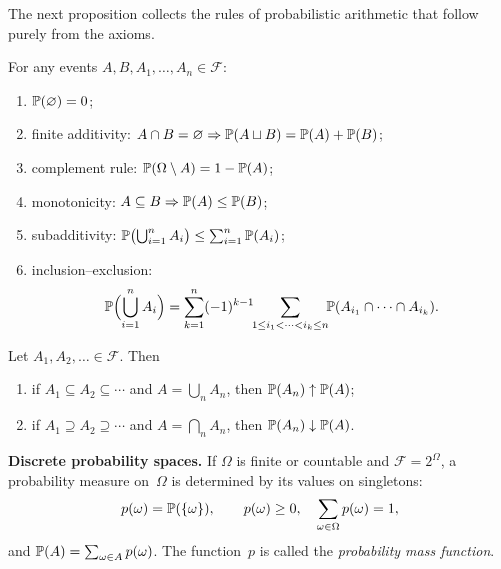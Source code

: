 The next proposition collects the rules of probabilistic arithmetic
that follow purely from the axioms.

\begin{proposition}
\label{prop:prob-elementary}
For any events $A, B, A_1, \dots, A_n \in \mathcal{F}$:
\begin{enumerate}[label=(\alph*)]
  \item $\mathbb{P}(\varnothing) = 0$;
  \item finite additivity: $A \cap B = \varnothing \Rightarrow \mathbb{P}(A \sqcup B) = \mathbb{P}(A) + \mathbb{P}(B)$;
  \item complement rule: $\mathbb{P}(\Omega \setminus A) = 1 - \mathbb{P}(A)$;
  \item monotonicity: $A \subseteq B \Rightarrow \mathbb{P}(A) \leq \mathbb{P}(B)$;
  \item subadditivity: $\mathbb{P}\bigl(\bigcup_{i=1}^{n} A_i\bigr) \leq \sum_{i=1}^{n} \mathbb{P}(A_i)$;
  \item inclusion–exclusion:
        \[
          \mathbb{P}\Bigl(\bigcup_{i=1}^{n} A_i\Bigr) = \sum_{k=1}^{n} (-1)^{k-1} \!\!\sum_{1 \leq i_1 < \cdots < i_k \leq n}\!\! \mathbb{P}(A_{i_1} \cap \cdots \cap A_{i_k}).
        \]
\end{enumerate}
\end{proposition}

\begin{theorem}
\label{thm:prob-continuity}
Let $A_1, A_2, \dots \in \mathcal{F}$. Then
\begin{enumerate}[label=(\alph*)]
  \item if $A_1 \subseteq A_2 \subseteq \cdots$ and
        $A = \bigcup_{n} A_n$, then $\mathbb{P}(A_n) \uparrow \mathbb{P}(A)$;
  \item if $A_1 \supseteq A_2 \supseteq \cdots$ and
        $A = \bigcap_{n} A_n$, then $\mathbb{P}(A_n) \downarrow \mathbb{P}(A)$.
\end{enumerate}
\end{theorem}

\medskip
\noindent\textbf{Discrete probability spaces.} If $\Omega$ is finite or
countable and $\mathcal{F} = 2^{\Omega}$, a probability measure
on~$\Omega$ is determined by its values on singletons:
\[
  p(\omega) = \mathbb{P}(\{\omega\}), \qquad p(\omega) \geq 0,\quad \sum_{\omega \in \Omega} p(\omega) = 1,
\]
and $\mathbb{P}(A) = \sum_{\omega \in A} p(\omega)$. The function~$p$ is
called the \emph{probability mass function}.

